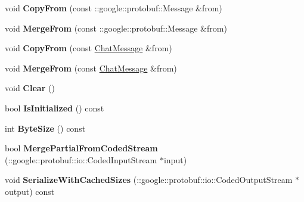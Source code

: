 \begin{DoxyCompactItemize}
\item 
\hypertarget{classSimpleChat_1_1ChatMessage_ab76ad9474fddf3fff5e8ac32baced6f9}{void {\bfseries Copy\-From} (const \-::google\-::protobuf\-::\-Message \&from)}\label{classSimpleChat_1_1ChatMessage_ab76ad9474fddf3fff5e8ac32baced6f9}

\item 
\hypertarget{classSimpleChat_1_1ChatMessage_a08b1dd53a5f0883e4b1c654d0d42c41f}{void {\bfseries Merge\-From} (const \-::google\-::protobuf\-::\-Message \&from)}\label{classSimpleChat_1_1ChatMessage_a08b1dd53a5f0883e4b1c654d0d42c41f}

\item 
\hypertarget{classSimpleChat_1_1ChatMessage_a9d0c6023de82cce729a4adfd0dab3fff}{void {\bfseries Copy\-From} (const \hyperlink{classSimpleChat_1_1ChatMessage}{Chat\-Message} \&from)}\label{classSimpleChat_1_1ChatMessage_a9d0c6023de82cce729a4adfd0dab3fff}

\item 
\hypertarget{classSimpleChat_1_1ChatMessage_a3ed1b027416e9e87e0cccfcc667eab28}{void {\bfseries Merge\-From} (const \hyperlink{classSimpleChat_1_1ChatMessage}{Chat\-Message} \&from)}\label{classSimpleChat_1_1ChatMessage_a3ed1b027416e9e87e0cccfcc667eab28}

\item 
\hypertarget{classSimpleChat_1_1ChatMessage_aa8568ebe3b5f1f0d8178db2838bce038}{void {\bfseries Clear} ()}\label{classSimpleChat_1_1ChatMessage_aa8568ebe3b5f1f0d8178db2838bce038}

\item 
\hypertarget{classSimpleChat_1_1ChatMessage_ab63f1149ba872d70d8eefcc85072bf0c}{bool {\bfseries Is\-Initialized} () const }\label{classSimpleChat_1_1ChatMessage_ab63f1149ba872d70d8eefcc85072bf0c}

\item 
\hypertarget{classSimpleChat_1_1ChatMessage_aa70f05d5b4548467d2568c8650c38691}{int {\bfseries Byte\-Size} () const }\label{classSimpleChat_1_1ChatMessage_aa70f05d5b4548467d2568c8650c38691}

\item 
\hypertarget{classSimpleChat_1_1ChatMessage_a2d550974195d6f5937eb465bea89844e}{bool {\bfseries Merge\-Partial\-From\-Coded\-Stream} (\-::google\-::protobuf\-::io\-::\-Coded\-Input\-Stream $\ast$input)}\label{classSimpleChat_1_1ChatMessage_a2d550974195d6f5937eb465bea89844e}

\item 
\hypertarget{classSimpleChat_1_1ChatMessage_a07a1a27d06b606f2171565d473a8d800}{void {\bfseries Serialize\-With\-Cached\-Sizes} (\-::google\-::protobuf\-::io\-::\-Coded\-Output\-Stream $\ast$output) const }\label{classSimpleChat_1_1ChatMessage_a07a1a27d06b606f2171565d473a8d800}


\end{DoxyCompactItemize}
